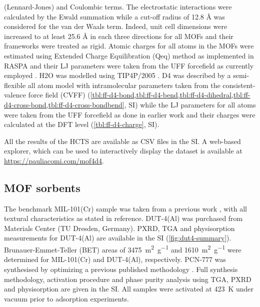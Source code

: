 (Lennard-Jones) and Coulombic terms. The electrostatic interactions were
calculated by the Ewald summation \citep{ewaldBerechnungOptischerUnd1921} while
a cut-off radius of 12.8 Å was considered for the van der Waals term. Indeed,
unit cell dimensions were increased to at least 25.6 Å in each three directions
for all MOFs and their frameworks were treated as rigid. Atomic charges for all
atoms in the MOFs were estimated using Extended Charge Equilibration (Qeq)
method as implemented in RASPA \citep{dubbeldamRASPAMolecularSimulation2016} and
their LJ parameters were taken from the UFF forcefield as currently employed
\citep{qiaoHighthroughputComputationalScreening2017,
keskinProgressOpportunitiesChallenges2009}. H2O was modelled using TIP4P/2005
\citep{abascalGeneralPurposeModel2005}. D4 was described by a semi-flexible all
atom model with intramolecular parameters taken from the consistent-valence
force field (CVFF) \citep{dauber-osguthorpeStructureEnergeticsLigand1988}
(\cref{tbl:ff-d4-bond,tbl:ff-d4-bend,tbl:ff-d4-dihedral,tbl:ff-d4-cross-bond,tbl:ff-d4-cross-bondbend},
SI) while the LJ parameters for all atoms were taken from the UFF forcefield as
done in earlier work \citep{xuSolvationForceSimulations2014} and their charges
were calculated at the DFT level (\cref{tbl:ff-d4-charge}, SI).

All the results of the HCTS are available as CSV files in the SI. A web-based
explorer, which can be used to interactively display the dataset is available at
\url{https://pauliacomi.com/mof4d4}.

\subsection{MOF sorbents}\label{methodology-benchmark}

The benchmark MIL-101(Cr) sample was taken from a previous work
\citep{pillaiCapturePerformancesHybrid2017}, with all textural characteristics
as stated in reference. DUT-4(Al) was purchased from Materials Center (TU Dresden,
Germany). PXRD, TGA and  physisorption measurements for DUT-4(Al) are
available in the SI (\cref{fig:dut4-summary}). Brunauer-Emmet-Teller (BET) areas
of \SI{3475}{\metre\squared\per\gram} and \SI{1610}{\metre\squared\per\gram}
were determined for MIL-101(Cr) and DUT-4(Al), respectively. PCN-777 was synthesised
by optimizing a previous published methodology
\citep{fengHighlyStableZeotype2015}. Full synthesis methodology, activation
procedure and phase purity analysis using TGA, PXRD and  physisorption
are given in the SI. All samples were activated at \SI{423}{\kelvin} under
vacuum prior to adsorption experiments.

